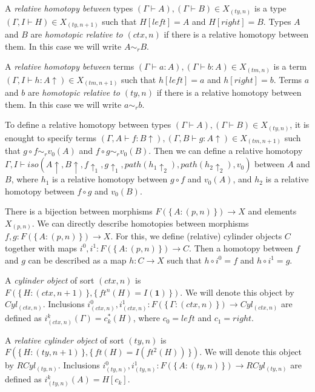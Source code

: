 \documentclass[reqno]{amsart}
\theoremstyle{definition}
\theoremstyle{remark}
\newcommand{\emptyCtx}{\mathbf{1}}
\numberwithin{figure}{section}
\begin{document}
A \emph{relative homotopy between} types $(\Gamma \vdash A), (\Gamma \vdash B) \in X_{(ty,n)}$ is a type $(\Gamma, I \vdash H) \in X_{(ty,n+1)}$ such that $H[left] = A$ and $H[right] = B$.
Types $A$ and $B$ are \emph{homotopic relative to $(ctx,n)$} if there is a relative homotopy between them.
In this case we will write $A \sim_r B$.

A \emph{relative homotopy between} terms $(\Gamma \vdash a : A), (\Gamma \vdash b : A) \in X_{(tm,n)}$ is a term $(\Gamma, I \vdash h : A\!\uparrow) \in X_{(tm,n+1)}$ such that $h[left] = a$ and $h[right] = b$.
Terms $a$ and $b$ are \emph{homotopic relative to $(ty,n)$} if there is a relative homotopy between them.
In this case we will write $a \sim_r b$.

\begin{remark}
To define a relative homotopy between types $(\Gamma \vdash A), (\Gamma \vdash B) \in X_{(ty,n)}$,
    it is enought to specify terms $(\Gamma, A \vdash f : B\!\uparrow), (\Gamma, B \vdash g : A\!\uparrow) \in X_{(tm,n+1)}$
    such that $g \circ f \sim_r v_0(A)$ and $f \circ g \sim_r v_0(B)$.
Then we can define a relative homotopy $\Gamma, I \vdash iso(A\!\uparrow, B\!\uparrow, f\!\uparrow_1, g\!\uparrow_1, path(h_1\!\!\uparrow_2), path(h_2\!\!\uparrow_2), v_0)$ between $A$ and $B$,
    where $h_1$ is a relative homotopy between $g \circ f$ and $v_0(A)$, and $h_2$ is a relative homotopy between $f \circ g$ and $v_0(B)$.
\end{remark}

There is a bijection between morphisms $F(\{\,A : (p,n)\,\}) \to X$ and elements $X_{(p,n)}$.
We can directly describe homotopies between morphisms $f,g : F(\{\,A : (p,n)\,\}) \to X$.
For this, we define (relative) cylinder objects $C$ together with maps $i^0,i^1 : F(\{\,A : (p,n)\,\}) \to C$.
Then a homotopy between $f$ and $g$ can be described as a map $h : C \to X$ such that $h \circ i^0 = f$ and $h \circ i^1 = g$.

A \emph{cylinder object} of sort $(ctx,n)$ is $F(\{\,H : (ctx,n+1)\,\}, \{\,ft^n(H) = I(\emptyCtx)\,\})$.
We will denote this object by $Cyl_{(ctx,n)}$.
Inclusions $i^0_{(ctx,n)}, i^1_{(ctx,n)} : F(\{\,\Gamma : (ctx,n)\,\}) \to Cyl_{(ctx,n)}$ are defined as $i^k_{(ctx,n)}(\Gamma) = c_k^*(H)$, where $c_0 = left$ and $c_1 = right$.

A \emph{relative cylinder object} of sort $(ty,n)$ is $F(\{\,H : (ty,n+1)\,\}, \{\,ft(H) = I(ft^2(H))\,\})$.
We will denote this object by $RCyl_{(ty,n)}$.
Inclusions $i^0_{(ty,n)}, i^1_{(ty,n)} : F(\{\,A : (ty,n)\,\}) \to RCyl_{(ty,n)}$ are defined as $i^k_{(ty,n)}(A) = H[c_k]$.
\end{document}
